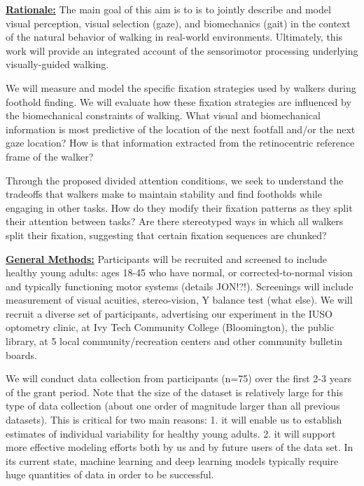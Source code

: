 

\textbf{\underline{Rationale:}}  The main goal of this aim is to is to jointly describe and model visual perception, visual selection (gaze), and biomechanics (gait) in the context of the natural behavior of walking in real-world environments.  Ultimately, this work will provide an integrated account of the sensorimotor processing underlying visually-guided walking.



We will measure and model the specific fixation strategies used by walkers during foothold finding.  We will evaluate how these fixation strategies are influenced by the biomechanical constraints of walking. What visual and biomechanical information is most predictive of the location of the next footfall and/or the next gaze location?  How is that information extracted from the retinocentric reference frame of the walker?

Through the proposed divided attention conditions, we seek to understand the tradeoffs that walkers make to maintain stability and find footholds while engaging in other tasks.  How do they modify their fixation patterns as they split their attention between tasks?  Are there stereotyped ways in which all walkers split their fixation, suggesting that certain fixation sequences are chunked?

\noindent\textbf{\underline{General Methods:}} Participants will be recruited and screened to include healthy young adults: ages 18-45 who have normal, or corrected-to-normal vision and typically functioning motor systems (details JON!?!). Screenings will include measurement of visual acuities, stereo-vision, Y balance test (what else). We will recruit a diverse set of participants, advertising our experiment in the IUSO optometry clinic, at Ivy Tech Community College (Bloomington), the public library, at 5 local community/recreation centers and other community bulletin boards.

We will conduct data collection from participants (n=75) over the first 2-3 years of the grant period. Note that the size of the dataset is relatively large for this type of data collection (about one order of magnitude larger than all previous datasets).  This is critical for two main reasons: 1. it will enable us to establish estimates of individual variability for healthy young adults.  2. it will support more effective modeling efforts both by us and by future users of the data set.  In its current state, machine learning and deep learning models typically require huge quantities of data in order to be successful.

